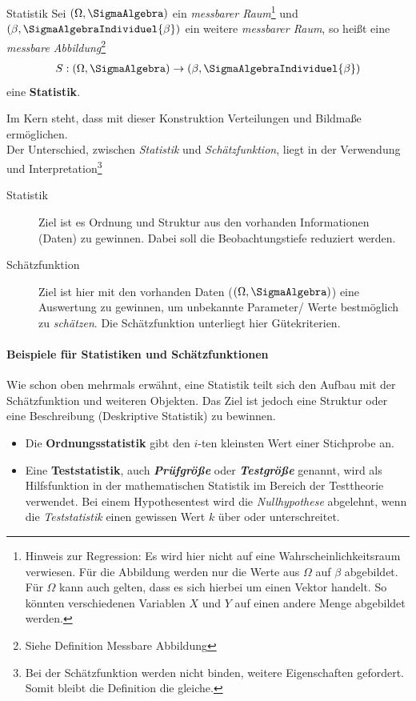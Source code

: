 \begin{Definition}{Statistik}
Sei $\left(\Omega,\SigmaAlgebra\right)$ ein \textit{messbarer Raum}\footnote{Hinweis zur Regression: Es wird hier nicht auf eine Wahrscheinlichkeitsraum verwiesen. Für die Abbildung werden nur die Werte aus $\Omega$ auf $\beta$ abgebildet. Für $\Omega$ kann auch gelten, dass es sich hierbei um einen Vektor handelt. So könnten verschiedenen Variablen $X$ und $Y$ auf einen andere Menge abgebildet werden.} und $\left(\beta, \SigmaAlgebraIndividuel{\beta}\right)$  ein weitere \textit{messbarer Raum}, so heißt eine \textit{messbare Abbildung}\footnote{Siehe Definition Messbare Abbildung }
\begin{align}
	S: \left(\Omega, \SigmaAlgebra\right) \rightarrow \left(\beta, \SigmaAlgebraIndividuel{\beta}\right)
\end{align}
eine \textbf{Statistik}.
\end{Definition}

Im Kern steht, dass mit dieser Konstruktion Verteilungen und Bildmaße ermöglichen.\\
Der Unterschied, zwischen \textit{Statistik} und \textit{Schätzfunktion}, liegt in der Verwendung und Interpretation\footnote{Bei der Schätzfunktion werden nicht binden, weitere Eigenschaften gefordert. Somit bleibt die Definition die gleiche.}

\begin{description}
	\item[Statistik] Ziel ist es Ordnung und Struktur aus den vorhanden Informationen (Daten) zu gewinnen. Dabei soll die Beobachtungstiefe reduziert werden. 
	\item[Schätzfunktion] Ziel ist hier mit den vorhanden Daten ($\left(\Omega, \SigmaAlgebra \right)$) eine Auswertung zu gewinnen, um unbekannte Parameter/ Werte bestmöglich zu \textit{schätzen}. Die Schätzfunktion unterliegt hier Gütekriterien.
\end{description}

\paragraph{Beispiele für Statistiken und Schätzfunktionen}
Wie schon oben mehrmals erwähnt, eine Statistik teilt sich den Aufbau mit der Schätzfunktion und weiteren Objekten. Das Ziel ist jedoch eine Struktur oder eine Beschreibung (Deskriptive Statistik) zu bewinnen.\\

\begin{itemize}
	\item Die \textbf{Ordnungsstatistik} gibt den $i$-ten kleinsten Wert einer Stichprobe an.\\
	\item Eine \textbf{Teststatistik}, auch \textit{\textbf{Prüfgröße}} oder \textit{\textbf{Testgröße}} genannt, wird als Hilfsfunktion in der mathematischen Statistik im Bereich der Testtheorie verwendet. Bei einem Hypothesentest wird die \textit{Nullhypothese} abgelehnt, wenn die \textit{Teststatistik} einen gewissen Wert $k$ über oder unterschreitet.
\end{itemize}


